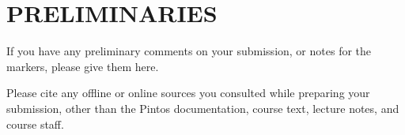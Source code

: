 \section*{PRELIMINARIES}

If you have any preliminary comments on your submission, or notes for the
markers, please give them here.

\noindent Please cite any offline or online sources you consulted while
preparing your submission, other than the Pintos documentation, course
text, lecture notes, and course staff.

